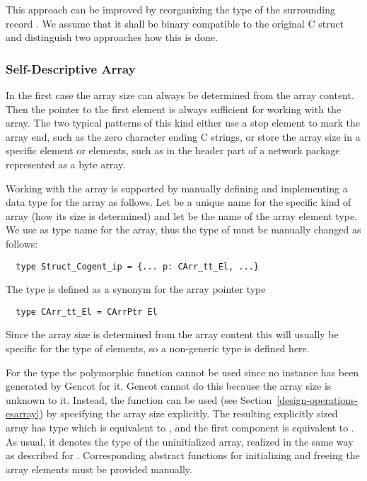 This approach can be improved by reorganizing the type of the surrounding record . We
assume that it shall be binary compatible to the original C struct  and distinguish two approaches how 
this is done.

\subsubsection{Self-Descriptive Array}

In the first case the array size can always be determined from the array content. Then the pointer to the first 
element is always sufficient for working with the array. The two typical patterns of this kind either use a 
stop element to mark the array end, such as the zero character ending C strings, or store the array size in a
specific element or elements, such as in the header part of a network package represented as a byte array.

Working with the array is supported by manually defining and implementing a data type for the array as follows.
Let  be a unique name for the specific kind of array (how its size is determined) and let  be the
name of the array element type. We use  as type name for the array, thus the 
type of  must be manually changed as follows:
\begin{verbatim}
  type Struct_Cogent_ip = {... p: CArr_tt_El, ...}
\end{verbatim}

The type  is defined as a synonym for the array pointer type
\begin{verbatim}
  type CArr_tt_El = CArrPtr El
\end{verbatim}
Since the array size is determined from the array content this will usually be specific for the type of elements,
so a non-generic type is defined here.

For the type  the polymorphic function  cannot be used since no instance has been
generated by Gencot for it. Gencot cannot do this because the array size is unknown to it. Instead, the function
 can be used (see Section~\ref{design-operations-esarray}) by specifying the array size explicitly. 
The resulting explicitly sized array has type  which is equivalent to ,
and the first component is equivalent to .
As usual, it denotes the type of the uninitialized array, realized in the same way as described for . 
Corresponding abstract functions for initializing and freeing the array elements must be provided manually.

